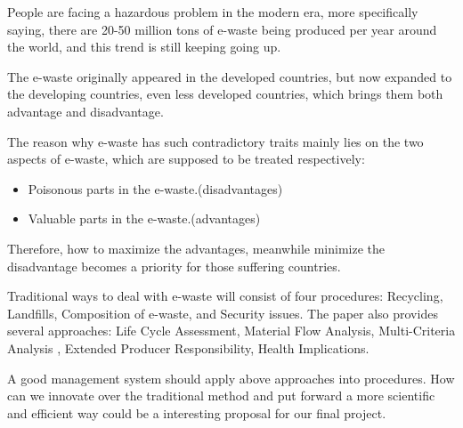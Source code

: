 People are facing a hazardous problem in the modern era, more specifically saying, there are 20-50 million tons of 
e-waste being produced per year around the world, and this trend is still keeping going up. \cite{shah2015overview}

The e-waste originally appeared in the developed countries, but now expanded to the developing countries, even less 
developed countries, which brings them both advantage and disadvantage.

The reason why e-waste has such contradictory traits mainly lies on the two aspects of e-waste, which are supposed to 
be treated respectively:

\begin{itemize}
	\item Poisonous parts in the e-waste.(disadvantages)
	\item Valuable parts in the e-waste.(advantages)
\end{itemize}

Therefore, how to maximize the advantages, meanwhile minimize the disadvantage becomes a priority for those suffering 
countries.

Traditional ways to deal with e-waste will consist of four procedures: Recycling, Landfills, Composition of e-waste, 
and Security issues.
The paper also provides several approaches: Life Cycle Assessment, Material Flow Analysis, Multi-Criteria Analysis , 
Extended Producer Responsibility, Health Implications.

A good management system should apply above approaches into procedures. How can we innovate over the traditional method
and put forward a more scientific and efficient way could be a interesting proposal for our final project.